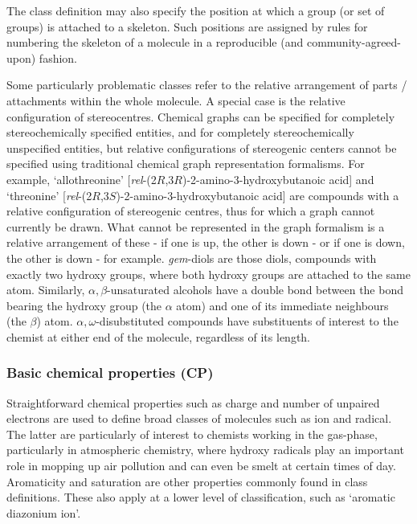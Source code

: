 \documentclass[10pt]{bmc_article}
\newenvironment{bmcformat}{\baselineskip20pt\sloppy\setboolean{publ}{false}}{\baselineskip20pt\sloppy}
\begin{document}
\begin{bmcformat}
The class definition may also specify the position at which a group (or set of groups) is attached to a skeleton. Such positions are assigned by rules for numbering the skeleton of a molecule in a reproducible (and community-agreed-upon) fashion.  %

Some particularly problematic classes refer to the relative arrangement of parts / attachments within the whole molecule. A special case is the relative configuration of stereocentres. Chemical graphs can be specified for completely stereochemically specified entities, and for completely stereochemically unspecified entities, but relative configurations of stereogenic centers cannot be specified using traditional chemical graph representation formalisms. For example, `allothreonine' [\textit{rel}-(2$R$,3$R$)-2-amino-3-hydroxybutanoic acid] and `threonine' [\textit{rel}-(2$R$,3$S$)-2-amino-3-hydroxybutanoic acid] are compounds with a relative configuration of stereogenic centres, thus for which a graph cannot currently be drawn. What cannot be represented in the graph formalism is a relative arrangement of these - if one is up, the other is down - or if one is down, the other is down - for example. 
\textit{gem}-diols are those diols, compounds with exactly two hydroxy groups, where both hydroxy groups are attached to the same atom.  Similarly, $\alpha,\beta$-unsaturated alcohols have a double bond between the bond bearing the hydroxy group (the $\alpha$ atom) and one of its immediate neighbours (the $\beta$) atom. $\alpha,\omega$-disubstituted compounds have substituents of interest to the chemist at either end of the molecule, regardless of its length.

\subsubsection*{Basic chemical properties (CP)}

Straightforward chemical properties such as charge and number of unpaired electrons are used to define broad classes of molecules such as ion and radical. The latter are particularly of interest to chemists working in the gas-phase, particularly in atmospheric chemistry, where hydroxy radicals play an important role in mopping up air pollution and can even be smelt at certain times of day. Aromaticity and saturation are other properties commonly found in class definitions. These also apply at a lower level of classification, such as `aromatic diazonium ion'.  


\end{bmcformat}
\end{document}

